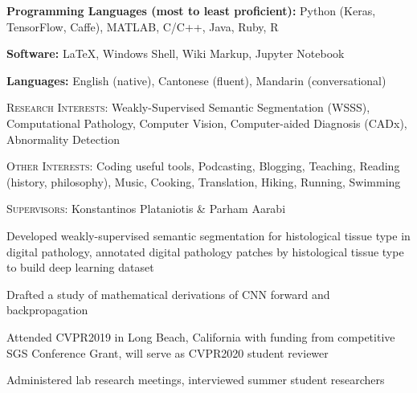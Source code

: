 \documentclass[12pt]{cv_style}
\begin{document}
\begin{ditem}
	\item \textbf{Programming Languages (most to least proficient):} Python (Keras, TensorFlow, Caffe), MATLAB, C/C++, Java, Ruby, R
	\item \textbf{Software:} \LaTeX, Windows Shell, Wiki Markup, Jupyter Notebook
	\item \textbf{Languages:} English (native), Cantonese (fluent), Mandarin (conversational)
\end{ditem}

\begin{ditem}
	\item \textsc{Research Interests:} Weakly-Supervised Semantic Segmentation (WSSS), Computational Pathology, Computer Vision, Computer-aided Diagnosis (CADx), Abnormality Detection
	\item \textsc{Other Interests:} Coding useful tools, Podcasting, Blogging, Teaching, Reading (history, philosophy), Music, Cooking, Translation, Hiking, Running, Swimming
\end{ditem}

\newpage
\textsc{Supervisors:} Konstantinos Plataniotis \& Parham Aarabi
\begin{ditem}
	\item Developed weakly-supervised semantic segmentation for histological tissue type in digital pathology, annotated digital pathology patches by histological tissue type to build deep learning dataset
	\item Drafted a study of mathematical derivations of CNN forward and backpropagation
	\item Attended CVPR2019 in Long Beach, California with funding from competitive SGS Conference Grant, will serve as CVPR2020 student reviewer
	\item Administered lab research meetings, interviewed summer student researchers
\end{ditem}
\end{document}
